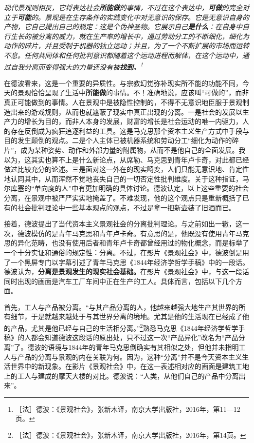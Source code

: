 \documentclass[fontset=fandol, a4paper, 12pt, openright]{ctexbook}
\renewenvironment{quote}
  {\list{}{\rightmargin\leftmargin}%
   \item\relax\small\itshape\color{darkgray}}
  {\endlist}
\begin{document}
\begin{quote}
现代景观则相反，它将表达社会\textbf{所能做}的事情，不过在这个表达中，\textbf{可做}的完全对立于\textbf{可能}的。景观是在生存条件的实践变化中对无意识的保存。它是无意识自身的产物，它自己提出自己的规定：这是个伪神圣物。它展示自己\textbf{是什么}：在自身中自行生长的被分离的威力，就在生产率的增长中，通过劳动分工的不断细化，细化为动作的碎片，并且受制于机器的独立运动；并且，为了一个不断扩展的市场而运转不息。任何共同体和任何批判意识都随着这个运动进程而解体，在这个运动中，通过自我分离而变得强大的力量还没有被\textbf{找到}。\footnote{［法］德波：《景观社会》，张新木译，南京大学出版社，2016年，第11—12页。}
\end{quote}

在德波看来，这是一个重要的异质性。与宗教幻觉弥补现实所不能的功能不同，今天的景观恰恰呈现了生活中\textbf{所能做}的事情。不！准确地说，应该叫“可做的”，而非真正可能做到的事情。人在景观中是被隐性控制的，不得不无意识地臣服于景观制造出来的游戏规则，从而也就遮蔽了现实中真正出现的分离。一是社会的发展以生产力的增长为目的，而非人本身的发展，财富的增长是社会运动的唯一内驱力，人的存在反倒成为疯狂追逐利益的工具。{\kaishu 这是马克思那个资本主义生产方式中手段与目的发生颠倒的观点。}二是个人主体已被机器系统和劳动分工“细化为动作的碎片”，成为某种姿势、动作和外部力量的附属物，从而不是他自己的全面发展。{\kaishu 我以为，这其实也算不上是什么新论点，从席勒、马克思到青年卢卡奇，对此都已经做过比较充分的论述。}三是面对这一外在的现实畸变，人们只能无意识地、肯定性地认同其中，从而浑然不觉地丧失自己的一切否定性批判维度。{\kaishu 关于这种指证，马尔库塞的“单向度的人”中有更加明确的具体讨论。}德波认定，以上这些重要的社会分离，在景观中被严严实实地掩盖了。不难发现，他的这个观点只是重新概括了已有的社会批判理论中一些基本观点的观点，不过是拿一把新壶装了旧酒而已。

接着，德波提出了当代资本主义景观社会的分离批判理论。{\kaishu 与之前如出一辙，这一次，德波模仿的是青年马克思和青年卢卡奇。有意思的是，他既没有使用青年马克思的异化范畴，也没有使用后者和青年卢卡奇都曾经用过的物化概念，而是标举了一个十分实证和通俗的规定性：分离。不过，在影片《景观社会》中，德波倒是用了一个黑屏专门以字幕引述了青年马克思《1844年经济学哲学手稿》中的一段话。}德波认为，\textbf{分离是景观发生的现实社会基础。}{\kaishu 在影片《景观社会》中，与这一段话同时出现的画面是汽车工厂车间中正在生产的工人。}具体而言，包括以下几个方面。

首先，工人与产品被分离。“与其产品分离的人，他越来越强大地生产其世界的所有细节，于是就越来越处于与其世界分离的境地。尤其是他的生活现在已经成了他的产品，尤其是他已经与自己的生活相分离。”\footnote{［法］德波：《景观社会》，张新木译，南京大学出版社，2016年，第14页。}熟悉马克思《1844年经济学哲学手稿》的人都会知道德波这段话的原出处，只不过这一次“产品异化”改名为“产品分离”了。德波的语境与1844年的青年马克思倒确实有其相似之处，但他并未指明工人与产品的分离与景观的内在关联为何。因为，这种“分离”并不是今天资本主义生活世界中的新现象。{\kaishu 在影片《景观社会》中，在这一表述相对应的画面是建筑工地上的工人与建成的摩天大楼的对比。德波说：“人类，从他们自己的产品中分离出来”。}
\end{document}
